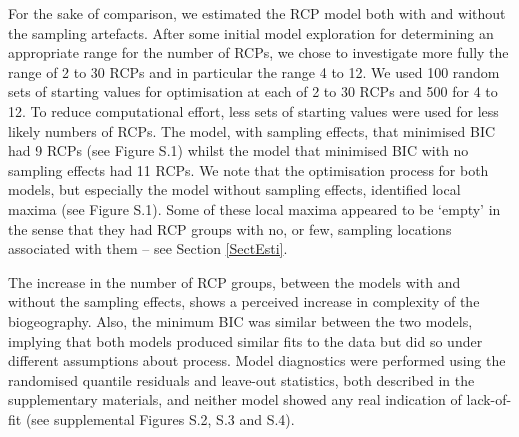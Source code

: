 \documentclass{statsoc}
\begin{document}
For the sake of comparison, we estimated the RCP model both with and without the sampling artefacts. After some initial model exploration for determining an appropriate range for the number of RCPs, we chose to investigate more fully the range of 2 to 30 RCPs and in particular the range 4 to 12. We used 100 random sets of starting values for optimisation at each of 2 to 30 RCPs and 500 for 4 to 12. To reduce computational effort, less sets of starting values were used for less likely numbers of RCPs. The model, with sampling effects, that minimised BIC had 9 RCPs (see Figure S.1) whilst the model that minimised BIC with no sampling effects had 11 RCPs. We note that the optimisation process for both models, but especially the model without sampling effects, identified local maxima (see Figure S.1). Some of these local maxima appeared to be `empty' in the sense that they had RCP groups with no, or few, sampling locations associated with them -- see Section \ref{SectEsti}. %

The increase in the number of RCP groups, between the models with and without the sampling effects,  shows a perceived increase in complexity of the biogeography. Also, the minimum BIC was similar between the two models, implying that both models produced similar fits to the data but did so under different assumptions about process. Model diagnostics were performed using the randomised quantile residuals and leave-out statistics, both described in the supplementary materials, and neither model showed any real indication of lack-of-fit (see supplemental Figures S.2, S.3 and S.4).
\end{document}
